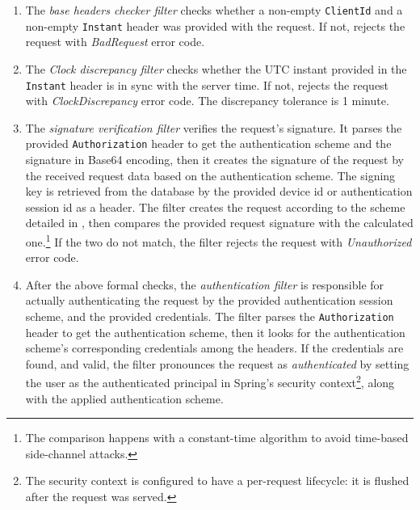 \begin{enumerate}
\item The \emph{base headers checker filter} checks whether a non-empty \lstinline{ClientId} and a non-empty \lstinline{Instant} header was provided with the request. If not, rejects the request with \emph{BadRequest} error code.

\item The \emph{Clock discrepancy filter} checks whether the UTC instant provided in the \lstinline{Instant} header is in sync with the server time. If not, rejects the request with \emph{ClockDiscrepancy} error code. The discrepancy tolerance is 1 minute.

\item The \emph{signature verification filter} verifies the request's signature. It parses the provided \lstinline{Authorization} header to get the authentication scheme and the signature in Base64 encoding, then it creates the signature of the request by the received request data based on the authentication scheme. The signing key is retrieved from the database by the provided device id or authentication session id as a header. The filter creates the request according to the scheme detailed in , then compares the provided request signature with the calculated one.\footnote{The comparison happens with a constant-time algorithm to avoid time-based side-channel attacks.} If the two do not match, the filter rejects the request with \emph{Unauthorized} error code.

\item After the above formal checks, the \emph{authentication filter} is responsible for actually authenticating the request by the provided authentication session scheme, and the provided credentials. The filter parses the \lstinline{Authorization} header to get the authentication scheme, then it looks for the authentication scheme's corresponding credentials among the headers. If the credentials are found, and valid, the filter pronounces the request as \emph{authenticated} by setting the user as the authenticated principal in Spring's security context\footnote{The security context is configured to have a per-request lifecycle: it is flushed after the request was served.}, along with the applied authentication scheme.
\end{enumerate}

